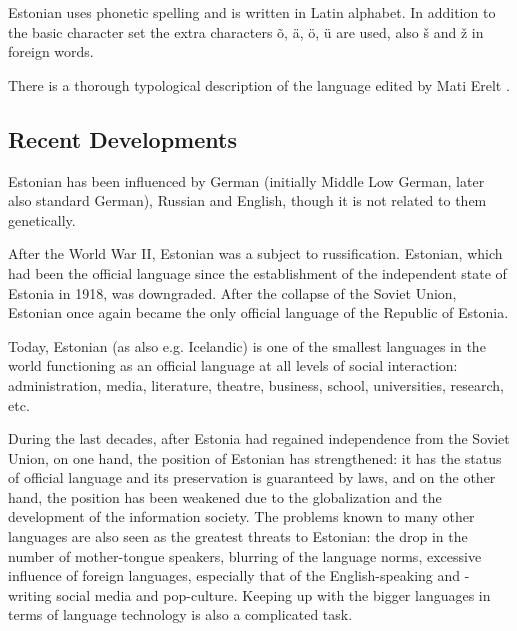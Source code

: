 \documentclass[]{../metanetpaper}
\begin{document}
\begin{multicols}{2}
Estonian uses phonetic spelling and is written in Latin alphabet. 
In addition to the basic character set the extra characters õ, ä, ö, ü are used, also š and ž in foreign words.

There is a thorough typological description of the language edited by Mati Erelt \cite{erelt2003}. %

\subsection{Recent Developments}

Estonian has been influenced by German (initially Middle Low German, later also standard German), Russian and English, though it is not related to them genetically.

After the World War II, Estonian was a subject to russiﬁcation. 
Estonian, which had been the official language since the establishment of the independent state of Estonia in 1918, was downgraded. 
After the collapse of the Soviet Union, Estonian once again became the
only official language of the Republic of Estonia. 
 
Today, Estonian (as also e.g. Icelandic) is one of the smallest languages in the world functioning as an official language at all levels of social interaction: administration, media, literature, theatre, business, school, universities, research, etc.

During the last decades, after Estonia had regained independence from the Soviet Union, on one hand, the position of Estonian has strengthened: it has the status of official language and its preservation is guaranteed by laws, and on the other hand, the position has been weakened due to the globalization and the development of the information society. 
The problems known to many other languages are also seen as the greatest threats to Estonian: the drop in the number of mother-tongue speakers, blurring of the language norms, excessive inﬂuence of foreign languages, especially that of the English-speaking and -writing social media and pop-culture. 
Keeping up with the bigger languages in terms of language technology is also a complicated task.



\end{multicols}
\end{document}

